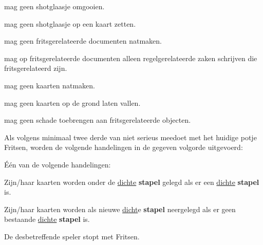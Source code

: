 
\newpage
{}
\label{sec:algemeen_einde}



\vervolgLijst{}
    \item \EenSpeler mag geen shotglaasje omgooien.
\eindLijst{} 

\vervolgLijst{}
    \item \EenSpeler mag geen shotglaasje op een kaart zetten.
\eindLijst{} 

\vervolgLijst{}
    \item \EenSpeler mag geen fritsgerelateerde documenten natmaken.
\eindLijst{} 

\vervolgLijst{}
    \item \EenSpeler mag op fritsgerelateerde documenten alleen regelgerelateerde zaken schrijven die fritsgerelateerd zijn.
\eindLijst{}

\vervolgLijst{}
    \item \EenSpeler mag geen kaarten natmaken.
\eindLijst{}  

\vervolgLijst{}
    \item \EenSpeler mag geen kaarten op de grond laten vallen.
\eindLijst{}  

\vervolgLijst{}
    \item \EenSpeler mag geen schade toebrengen aan fritsgerelateerde objecten. 
\eindLijst{}



\vervolgLijst{}
    \item Als \eenSpeler volgens minimaal twee derde van \alleSpelers niet serieus meedoet met het huidige potje Fritsen, worden de volgende handelingen in de gegeven volgorde uitgevoerd:
    \numeriekeLijst{}
        \item Één van de volgende handelingen:
        \puntLijst{}
            \item Zijn/haar kaarten worden onder de \ul{dichte} \textbf{stapel} gelegd als er een \ul{dichte} \textbf{stapel} is. 
            \item Zijn/haar kaarten worden als nieuwe \ul{dicht}e \textbf{stapel} neergelegd als er geen bestaande \ul{dichte} \textbf{stapel} is.
        \eindPuntLijst{}
        \item De desbetreffende speler stopt met Fritsen.
    \eindNumeriekeLijst{}
\eindLijst{}

